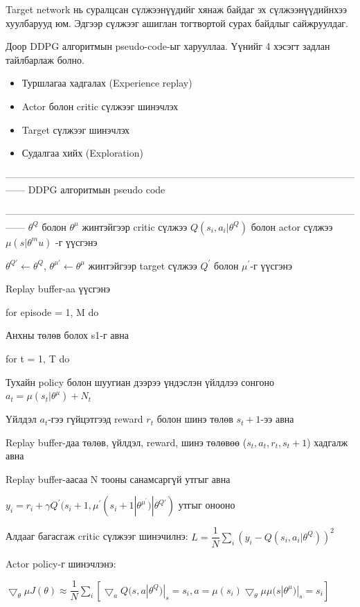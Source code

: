 \documentclass[12pt,A4]{report}
\begin{document}
Target network нь суралцсан сүлжээнүүдийг хянаж байдаг эх сүлжээнүүдийнхээ хуулбарууд юм. Эдгээр сүлжээг ашиглан тогтвортой сурах байдлыг сайжруулдаг.	

Доор DDPG алгоритмын pseudo-code-ыг харууллаа. Үүнийг 4 хэсэгт задлан тайлбарлаж болно.

\begin{itemize}
	\item Туршлагаа хадгалах (Experience replay)
	\item Actor болон critic сүлжээг шинэчлэх
	\item Target сүлжээг шинэчлэх
	\item Судалгаа хийх (Exploration)
\end{itemize} 

------------------------------------------------------------------------------------------------------------------
DDPG алгоритмын pseudo code

------------------------------------------------------------------------------------------------------------------
$\theta^Q$ болон $\theta^{\mu}$ жинтэйгээр critic сүлжээ $Q(s_i,a_i|\theta^Q)$ болон actor сүлжээ $\mu(s|\theta^mu)$ -г үүсгэнэ

$\theta^{Q{'}} \longleftarrow \theta^Q$, $\theta^{\mu{'}} \longleftarrow \theta^\mu$ жинтэйгээр target сүлжээ $Q^{'}$ болон $\mu^{'}$-г үүсгэнэ

Replay buffer-aa үүсгэнэ

for episode = 1, M do

\quad Анхны төлөв болох s1-г авна

\quad for t = 1, T do

\quad\quad Тухайн policy болон шуугиан дээрээ үндэслэн үйлдлээ сонгоно $a_t = \mu(s_t|\theta^\mu)+N_t$

\quad\quad Үйлдэл $a_t$-гээ гүйцэтгээд reward $r_t$ болон шинэ төлөв $s_t+1$-ээ авна

\quad\quad Replay buffer-даа төлөв, үйлдэл, reward, шинэ төлөвөө ($s_t, a_t, r_t, s_t+1$) хадгалж авна

\quad\quad Replay buffer-аасаа N тооны санамсаргүй утгыг авна

\quad\quad $y_i=r_i+\gamma{Q^{'}}(s_i+1,\mu^{'}(s_i+1|\theta^{\mu^{'}})|\theta^{Q{'}})$ утгыг онооно

\quad\quad Алдааг багасгаж critic сүлжээг шинэчилнэ: $L = \dfrac{1}{N}\sum_{i}(y_i-Q(s_i,a_i|\theta^Q))^2$

\quad\quad Actor policy-г шинэчлэнэ: 
\begin{center}
$\bigtriangledown_\theta\mu J(\theta) \approx \dfrac{1}{N}\sum_{i}[\bigtriangledown_a Q(s, a|\theta^Q)|_s=s_i,a=\mu(s_i)\bigtriangledown_\theta\mu \mu(s|\theta^\mu)|_s=s_i]$
\end{center}
\end{document}
